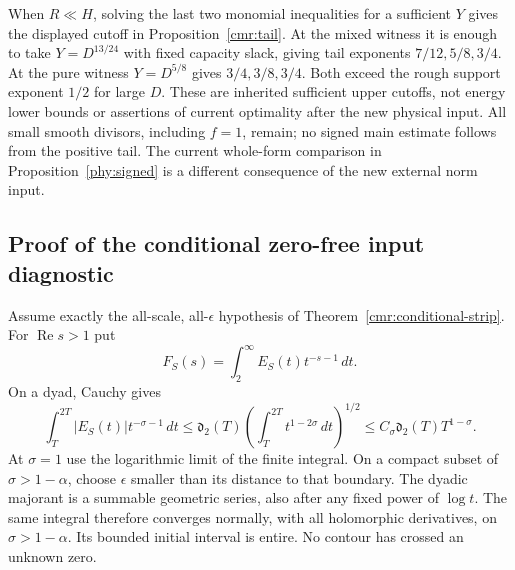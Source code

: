 \documentclass[11pt]{article}
\theoremstyle{definition}\newtheorem{definition}[theorem]{Definition}
\theoremstyle{remark}\newtheorem{remark}[theorem]{Remark}
\begin{document}
When $R\ll H$, solving the last two monomial inequalities for a
sufficient $Y$ gives the displayed cutoff in Proposition~\ref{cmr:tail}.
At the mixed witness it is enough to take $Y=D^{13/24}$ with fixed
capacity slack, giving tail exponents $7/12,5/8,3/4$.
At the pure witness $Y=D^{5/8}$ gives $3/4,3/8,3/4$.
Both exceed the rough support exponent $1/2$ for large $D$.
These are inherited sufficient upper cutoffs, not energy lower bounds
or assertions of current optimality after the new physical input.
All small smooth divisors, including $f=1$, remain; no signed main
estimate follows from the positive tail. The current whole-form
comparison in Proposition~\ref{phy:signed} is a different consequence of the
new external norm input.

\subsection{Proof of the conditional zero-free input diagnostic}
\label{cmr:strip-proof}
Assume exactly the all-scale, all-$\epsilon$ hypothesis of
Theorem~\ref{cmr:conditional-strip}. For $\operatorname{Re}s>1$ put
\[
 F_S(s)=\int_2^\infty E_S(t)t^{-s-1}\,dt.
\]
On a dyad, Cauchy gives
\[
 \int_T^{2T}|E_S(t)|t^{-\sigma-1}\,dt
 \le\mathfrak d_2(T)
       \left(\int_T^{2T}t^{1-2\sigma}\,dt\right)^{1/2}
 \le C_\sigma\mathfrak d_2(T)T^{1-\sigma}.
\]
At $\sigma=1$ use the logarithmic limit of the finite integral.
On a compact subset of $\sigma>1-\alpha$, choose $\epsilon$ smaller
than its distance to that boundary. The dyadic majorant is a
summable geometric series, also after any fixed power of $\log t$.
The same integral therefore converges normally, with all holomorphic
derivatives, on $\sigma>1-\alpha$. Its bounded initial interval is
entire. No contour has crossed an unknown zero.
\end{document}
